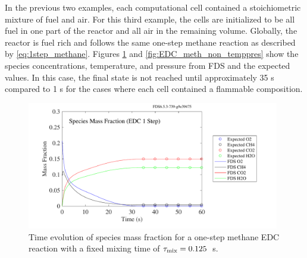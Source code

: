 \documentclass[11pt]{book}
\begin{document}
In the previous two examples, each computational cell contained a stoichiometric mixture of fuel and air. For this third example, the cells are initialized to be all fuel in one part of the reactor and all air in the remaining volume. Globally, the reactor is fuel rich and follows the same one-step methane reaction as described by \ref{eq:1step_methane}. Figures \ref{fig:EDC_meth_non_spec} and \ref{fig:EDC_meth_non_temppres} show the species concentrations, temperature, and pressure from FDS and the expected values. In this case, the final state is not reached until approximately 35 s compared to 1 s for the cases where each cell contained a flammable composition.

\begin{figure}[!ht]
\centering
\includegraphics[height=2.2in]{SCRIPT_FIGURES/reactionrate_EDC_1step_nonmix_spec}
\caption[Species evolution in 1-Step methane EDC reaction]{Time evolution of species mass fraction for a one-step methane EDC reaction with a fixed mixing time of $\tau_{\rm mix}=0.125$~s. }
\label{fig:EDC_meth_non_spec}
\end{figure}
\end{document}
